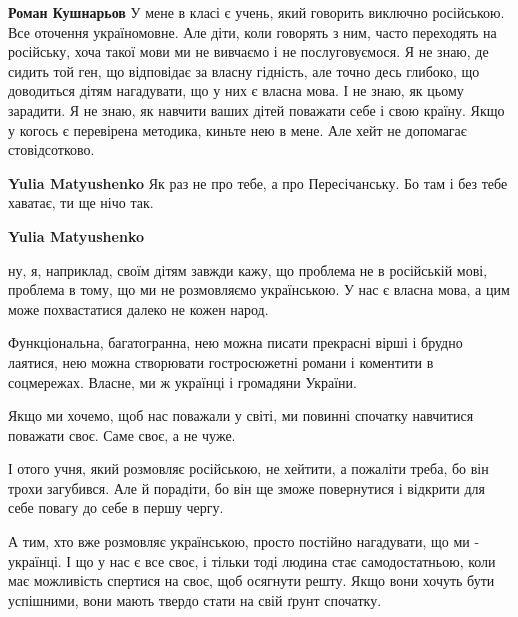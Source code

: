 \begin{itemize}
\begin{itemize}
\textbf{Роман Кушнарьов} У мене в класі є учень, який говорить виключно
російською. Все оточення україномовне. Але діти, коли говорять з ним, часто
переходять на російську, хоча такої мови ми не вивчаємо і не послуговуємося. Я
не знаю, де сидить той ген, що відповідає за власну гідність, але точно десь
глибоко, що доводиться дітям нагадувати, що у них є власна мова. І не знаю, як
цьому зарадити. Я не знаю, як навчити ваших дітей поважати себе і свою країну.
Якщо у когось є перевірена методика, киньте нею в мене. Але хейт не допомагає
стовідсотково.

 
\textbf{Yulia Matyushenko} Як раз не про тебе, а про Пересічанську. Бо там і без тебе хаватає, ти ще нічо так.

 
\textbf{Yulia Matyushenko} 

ну, я, наприклад, своїм дітям завжди кажу, що проблема не в російській мові,
проблема в тому, що ми не розмовляємо українською. У нас є власна мова, а цим
може похвастатися далеко не кожен народ. 

Функціональна, багатогранна, нею можна писати прекрасні вірші і брудно лаятися,
нею можна створювати гостросюжетні романи і коментити в соцмережах.  Власне, ми
ж українці і громадяни України. 

Якщо ми хочемо, щоб нас поважали у світі, ми повинні спочатку навчитися
поважати своє. Саме своє, а не чуже. 

І отого учня, який розмовляє російською, не хейтити, а пожаліти треба, бо він
трохи загубився. Але й порадіти, бо він ще зможе повернутися і відкрити для
себе повагу до себе в першу чергу. 

А тим, хто вже розмовляє українською, просто постійно нагадувати, що ми -
українці. І що у нас є все своє, і тільки тоді людина стає самодостатньою, коли
має можливість спертися на своє, щоб осягнути решту. Якщо вони хочуть бути
успішними, вони мають твердо стати на свій ґрунт спочатку.


\end{itemize}
\end{itemize}
